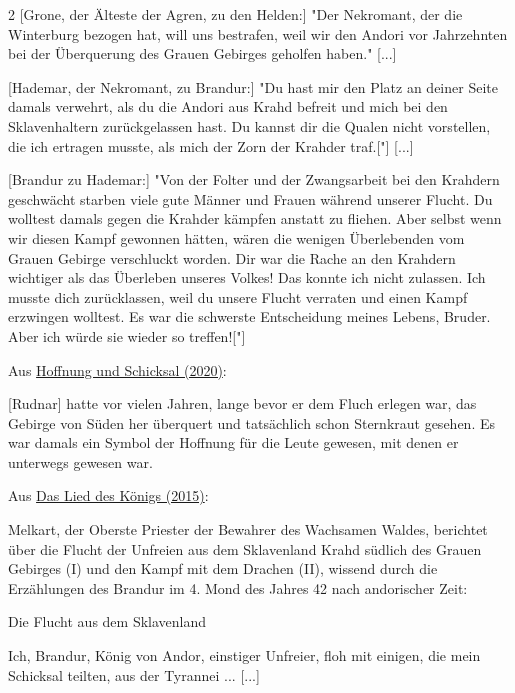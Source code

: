 \documentclass[10pt, a4paper, oneside]{book}
\newcommand{\refprodukt}[1]{\hyperref[Produkt: #1]{#1}}
\newcommand{\refstorytext}[1]{\hyperref[Storytext: #1]{#1}}
\begin{document}
\begin{multicols}{2}
[Grone, der Älteste der Agren, zu den Helden:] "Der Nekromant, der die Winterburg bezogen hat, will uns bestrafen, weil wir den Andori vor Jahrzehnten bei der Überquerung des Grauen Gebirges geholfen haben." [...]

[Hademar, der Nekromant, zu Brandur:] "Du hast mir den Platz an deiner Seite damals verwehrt, als du die Andori aus Krahd befreit und mich bei den Sklavenhaltern zurückgelassen hast. Du kannst dir die Qualen nicht vorstellen, die ich ertragen musste, als mich der Zorn der Krahder traf.["] [...]

[Brandur zu Hademar:] "Von der Folter und der Zwangsarbeit bei den Krahdern geschwächt starben viele gute Männer und Frauen während unserer Flucht. Du wolltest damals gegen die Krahder kämpfen anstatt zu fliehen. Aber selbst wenn wir diesen Kampf gewonnen hätten, wären die wenigen Überlebenden vom Grauen Gebirge verschluckt worden. Dir war die Rache an den Krahdern wichtiger als das Überleben unseres Volkes! Das konnte ich nicht zulassen. Ich musste dich zurücklassen, weil du unsere Flucht verraten und einen Kampf erzwingen wolltest. Es war die schwerste Entscheidung meines Lebens, Bruder. Aber ich würde sie wieder so treffen!["]


\begin{center}
    Aus \refstorytext{Hoffnung und Schicksal (2020)}:
\end{center}


[Rudnar] hatte vor vielen Jahren, lange bevor er dem Fluch erlegen war, das Gebirge von Süden her überquert und tatsächlich schon Sternkraut gesehen. Es war damals ein Symbol der Hoffnung für die Leute gewesen, mit denen er unterwegs gewesen war.

\begin{center}
    Aus \refprodukt{Das Lied des Königs (2015)}:
\end{center}



Melkart, der Oberste Priester der Bewahrer des Wachsamen Waldes, berichtet über die Flucht der Unfreien aus dem Sklavenland Krahd südlich des Grauen Gebirges (I) und den Kampf mit dem Drachen (II), wissend durch die Erzählungen des Brandur im 4. Mond des Jahres 42 nach andorischer Zeit:

Die Flucht aus dem Sklavenland
    
Ich, Brandur, König von Andor, einstiger Unfreier, floh mit einigen, die mein Schicksal teilten, aus der Tyrannei ... [...]\newpage %


\end{multicols}
\end{document}
